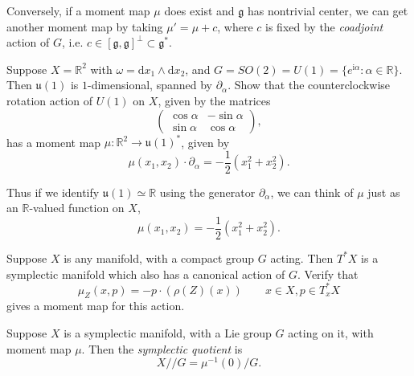 \documentclass[12pt,letterpaper,reqno]{article}
\numberwithin{equation}{section}
\newcommand{\fg}{{\mathfrak g}}
\newcommand{\fu}{{\mathfrak u}}
\newcommand{\R}{\ensuremath{\mathbb R}}
\newcommand{\half}{\ensuremath{\frac{1}{2}}}
\newcommand{\kq}{/\!\!/}
\newcommand{\I}{{\mathrm i}}
\newcommand{\de}{\mathrm{d}}
\newcommand{\ti}[1]{\textit{#1}}
\begin{document}
Conversely, if a moment map $\mu$ does exist and $\fg$
has nontrivial center, we can get another moment map by taking 
$\mu' = \mu + c$, where $c$ is fixed by the \ti{coadjoint}
action of $G$, i.e. $c \in [\fg,\fg]^\perp \subset \fg^*$.

\begin{exercise}
Suppose $X = \R^2$ with $\omega = \de x_1 \wedge \de x_2$, and
$G = SO(2) = U(1) = \{e^{\I \alpha}: \alpha \in \R \}$.
Then $\fu(1)$ is $1$-dimensional, spanned by $\partial_\alpha$.
Show that the counterclockwise rotation action of $U(1)$ on $X$, 
given by the matrices
\begin{equation}
   \begin{pmatrix} \cos \alpha & - \sin \alpha \\ \sin \alpha & \cos \alpha \end{pmatrix},
 \end{equation} 
has a moment map $\mu: \R^2 \to \fu(1)^*$, given by
\begin{equation}
  \mu(x_1,x_2) \cdot \partial_\alpha = -\half (x_1^2 + x_2^2).
\end{equation}
\end{exercise}
Thus if we identify $\fu(1) \simeq \R$ using the generator
$\partial_\alpha$, we can think of $\mu$ just as an $\R$-valued function
on $X$,
\begin{equation}
  \mu(x_1,x_2) = -\half (x_1^2 + x_2^2).
\end{equation}

\begin{exercise} \label{exc:cotangent-moment-map}
Suppose $X$ is any manifold, with a compact
group $G$ acting. Then $T^* X$ is a symplectic manifold
which also has a canonical action of $G$. Verify that
\begin{equation}
  \mu_Z(x,p) = -p \cdot (\rho(Z)(x)) \qquad x \in X, p \in T^*_x X
\end{equation}
gives a moment map for this action.
\end{exercise}

\begin{defn} \label{def:symplectic-quotient} \cite{MR0402819}
Suppose $X$ is a symplectic manifold, with a Lie group $G$
acting on it, with moment map $\mu$. Then the \ti{symplectic quotient}
is
\begin{equation}
  X \kq G = \mu^{-1}(0) / G.
\end{equation}
\end{defn}
\end{document}
